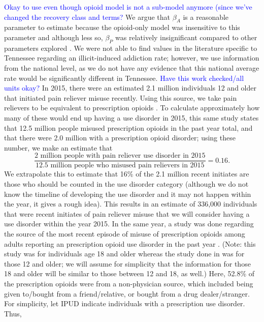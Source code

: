 \documentclass[12pt]{article}
\begin{document}
\textcolor{blue}{Okay to use even though opioid model is not a sub-model anymore (since we've changed the recovery class and terms?} We argue that $\beta_A$ is a reasonable parameter to estimate because the opioid-only model was insensitive to this parameter and although less so, $\beta_P$ was relatively insignificant compared to other parameters explored \cite{Battista}. We were not able to find values in the literature specific to Tennessee regarding an illicit-induced addiction rate; however, we use information from the national level, as we do not have any evidence that this national average rate would be significantly different in Tennessee. \textcolor{blue}{Have this work checked/all units okay?} In 2015, there were an estimated 2.1 million individuals 12 and older that initiated pain reliever misuse recently. Using this source, we take pain relievers to be equivalent to prescription opioids \cite{SAMSHA5}. To calculate approximately how many of these would end up having a use disorder in 2015, this same study states that 12.5 million people misused prescription opioids in the past year total, and that there were 2.0 million with a prescription opioid disorder; using these number, we make an estimate that \\
$$\frac{2 \text{ million people with pain reliever use disorder in 2015}}{12.5 \text{ million people who misused pain relievers in 2015}}=0.16.$$
We extrapolate this to estimate that 16\% of the 2.1 million recent initiates are those who should be counted in the use disorder category (although we do not know the timeline of developing the use disorder and it may not happen within the year, it gives a rough idea). This results in an estimate of 336,000 individuals that were recent initiates of pain reliever misuse that we will consider having a use disorder within the year 2015. In the same year, a study was done regarding the source of the most recent episode of misuse of prescription opioids among adults reporting an prescription opioid use disorder in the past year \cite{Han}. (Note: this study was for individuals age 18 and older whereas the study done in \cite{SAMSHA5} was for those 12 and older; we will assume for simplicity that the information for those 18 and older will be similar to those between 12 and 18, as well.) Here, 52.8\% of the prescription opioids were from a non-physician source, which included being given to/bought from a friend/relative, or bought from a drug dealer/stranger. For simplicity, let IPUD indicate individuals with a prescription use disorder. 
Thus, \\
\end{document}
